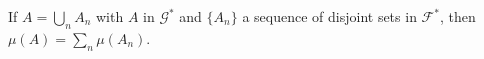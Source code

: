 If $A = \bigcup_n A_n$ with $A$ in $\mathcal{G}^*$ and $\{A_n\}$ a sequence of disjoint sets in $\mathcal{F}^*$, then $\mu(A) = \sum_n \mu(A_n)$.
